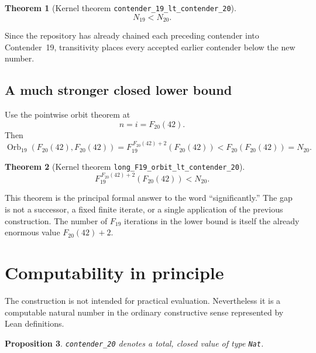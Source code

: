 \documentclass[11pt]{article}
\newtheorem{theorem}{Theorem}[section]
\newtheorem{proposition}[theorem]{Proposition}
\theoremstyle{definition}
\theoremstyle{remark}
\newcommand{\Orb}{\operatorname{Orb}_{19}}
\begin{document}
\begin{theorem}[Kernel theorem
\texttt{contender\_19\_lt\_contender\_20}]
\[
  N_{19}<N_{20}.
\]
\end{theorem}

Since the repository has already chained each preceding contender into
Contender~19, transitivity places every accepted earlier contender below the
new number.

\subsection{A much stronger closed lower bound}

Use the pointwise orbit theorem at
\[
  n=i=F_{20}(42).
\]
Then
\[
 \Orb(F_{20}(42),F_{20}(42))
 =F_{19}^{\,F_{20}(42)+2}(F_{20}(42))
 <F_{20}(F_{20}(42))=N_{20}.
\]

\begin{theorem}[Kernel theorem
\texttt{long\_F19\_orbit\_lt\_contender\_20}]
\[
  F_{19}^{\,F_{20}(42)+2}(F_{20}(42))<N_{20}.
\]
\end{theorem}

This theorem is the principal formal answer to the word ``significantly.''
The gap is not a successor, a fixed finite iterate, or a single application of
the previous construction.  The number of $F_{19}$ iterations in the lower
bound is itself the already enormous value $F_{20}(42)+2$.

\section{Computability in principle}
\label{sec:computability}

The construction is not intended for practical evaluation.  Nevertheless it
is a computable natural number in the ordinary constructive sense represented
by Lean definitions.

\begin{proposition}
\texttt{contender\_20} denotes a total, closed value of type \texttt{Nat}.
\end{proposition}
\end{document}
